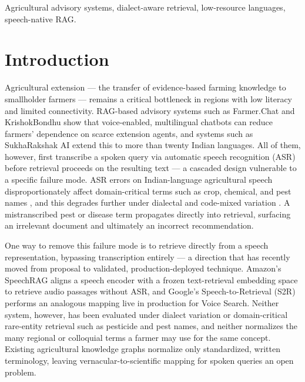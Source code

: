 \documentclass[conference]{IEEEtran}
\begin{document}
\renewcommand\IEEEkeywordsname{Keywords}
\begin{IEEEkeywords}
Agricultural advisory systems, dialect-aware retrieval, low-resource languages, speech-native RAG.
\end{IEEEkeywords}

\section{Introduction}
Agricultural extension — the transfer of evidence-based farming knowledge to smallholder farmers — remains a critical bottleneck in regions with low literacy and limited connectivity. RAG-based advisory systems such as Farmer.Chat \cite{farmerchat2024} and KrishokBondhu \cite{ameen2026krishokbondhu} show that voice-enabled, multilingual chatbots can reduce farmers' dependence on scarce extension agents, and systems such as SukhaRakshak AI \cite{iwmi2025sukharakshak} extend this to more than twenty Indian languages. All of them, however, first transcribe a spoken query via automatic speech recognition (ASR) before retrieval proceeds on the resulting text — a cascaded design vulnerable to a specific failure mode. ASR errors on Indian-language agricultural speech disproportionately affect domain-critical terms such as crop, chemical, and pest names \cite{benchmarkingasr2026}, and this degrades further under dialectal and code-mixed variation \cite{dialectmatters2026}. A mistranscribed pest or disease term propagates directly into retrieval, surfacing an irrelevant document and ultimately an incorrect recommendation.

One way to remove this failure mode is to retrieve directly from a speech representation, bypassing transcription entirely — a direction that has recently moved from proposal to validated, production-deployed technique. Amazon's SpeechRAG \cite{min2025speechrag} aligns a speech encoder with a frozen text-retrieval embedding space to retrieve audio passages without ASR, and Google's Speech-to-Retrieval (S2R) \cite{google2025s2r} performs an analogous mapping live in production for Voice Search. Neither system, however, has been evaluated under dialect variation or domain-critical rare-entity retrieval such as pesticide and pest names, and neither normalizes the many regional or colloquial terms a farmer may use for the same concept. Existing agricultural knowledge graphs \cite{wu2026cropgraphrag, kgeditorial2023} normalize only standardized, written terminology, leaving vernacular-to-scientific mapping for spoken queries an open problem.
\end{document}

